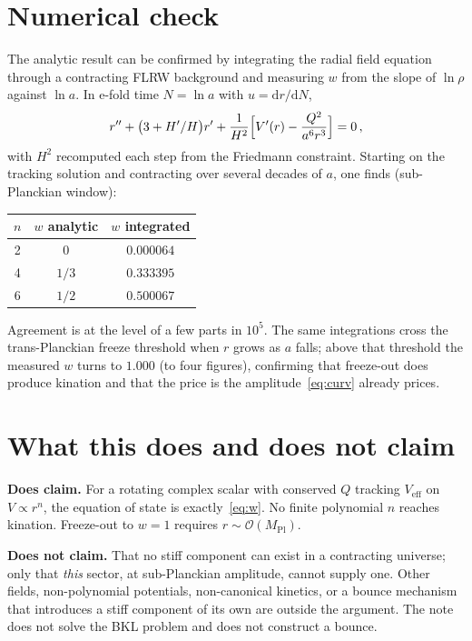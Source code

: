\documentclass[aps,prd,twocolumn,superscriptaddress,nofootinbib,10pt]{revtex4-2}
\begin{document}
\section{Numerical check}\label{sec:numerics}

The analytic result can be confirmed by integrating the radial field equation through a
contracting FLRW background and measuring $w$ from the slope of $\ln\rho$ against $\ln a$. In
e-fold time $N=\ln a$ with $u=\mathrm{d}r/\mathrm{d}N$,
\begin{equation}
  r'' + \bigl(3 + H'/H\bigr)r'
  + \frac{1}{H^{2}}\Bigl[V'(r)-\frac{Q^{2}}{a^{6}r^{3}}\Bigr] = 0\,,
\end{equation}
with $H^{2}$ recomputed each step from the Friedmann constraint. Starting on the tracking
solution and contracting over several decades of $a$, one finds (sub-Planckian window):

\begin{center}
\begin{tabular}{c c c}
\hline
$n$ & $w$ analytic & $w$ integrated \\
\hline
2 & $0$ & $0.000064$ \\
4 & $1/3$ & $0.333395$ \\
6 & $1/2$ & $0.500067$ \\
\hline
\end{tabular}
\end{center}

Agreement is at the level of a few parts in $10^{5}$. The same integrations cross the
trans-Planckian freeze threshold when $r$ grows as $a$ falls; above that threshold the measured
$w$ turns to $1.000$ (to four figures), confirming that freeze-out does produce kination and that
the price is the amplitude~\eqref{eq:curv} already prices.

\section{What this does and does not claim}\label{sec:scope}

\textbf{Does claim.} For a rotating complex scalar with conserved $Q$ tracking
$V_{\mathrm{eff}}$ on $V\propto r^{n}$, the equation of state is exactly~\eqref{eq:w}. No finite
polynomial $n$ reaches kination. Freeze-out to $w=1$ requires $r\sim\mathcal{O}(M_{\mathrm{Pl}})$.

\textbf{Does not claim.} That no stiff component can exist in a contracting universe; only that
\emph{this} sector, at sub-Planckian amplitude, cannot supply one. Other fields, non-polynomial
potentials, non-canonical kinetics, or a bounce mechanism that introduces a stiff component of its
own are outside the argument. The note does not solve the BKL problem and does not construct a
bounce.
\end{document}
